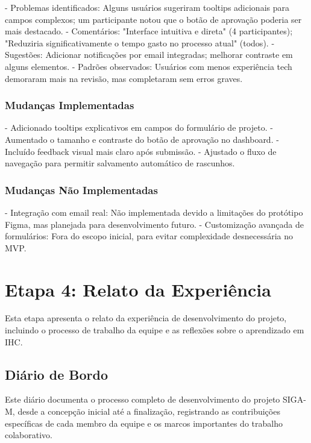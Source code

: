 \documentclass[12pt, a4paper]{report}
\begin{document}
- Problemas identificados: Alguns usuários sugeriram tooltips adicionais para campos complexos; um participante notou que o botão de aprovação poderia ser mais destacado.
- Comentários: "Interface intuitiva e direta" (4 participantes); "Reduziria significativamente o tempo gasto no processo atual" (todos).
- Sugestões: Adicionar notificações por email integradas; melhorar contraste em alguns elementos.
- Padrões observados: Usuários com menos experiência tech demoraram mais na revisão, mas completaram sem erros graves.

\subsection{Mudanças Implementadas}

- Adicionado tooltips explicativos em campos do formulário de projeto.
- Aumentado o tamanho e contraste do botão de aprovação no dashboard.
- Incluído feedback visual mais claro após submissão.
- Ajustado o fluxo de navegação para permitir salvamento automático de rascunhos.

\subsection{Mudanças Não Implementadas}

- Integração com email real: Não implementada devido a limitações do protótipo Figma, mas planejada para desenvolvimento futuro.
- Customização avançada de formulários: Fora do escopo inicial, para evitar complexidade desnecessária no MVP.

\chapter{Etapa 4: Relato da Experiência}
\label{ch:relato}

Esta etapa apresenta o relato da experiência de desenvolvimento do projeto, incluindo o processo de trabalho da equipe e as reflexões sobre o aprendizado em IHC.

\section{Diário de Bordo}

Este diário documenta o processo completo de desenvolvimento do projeto SIGA-M, desde a concepção inicial até a finalização, registrando as contribuições específicas de cada membro da equipe e os marcos importantes do trabalho colaborativo.
\end{document}
